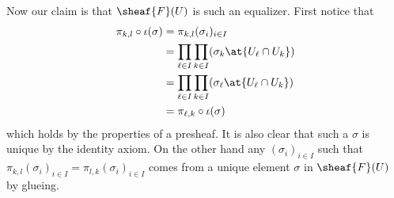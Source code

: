 Now our claim is that $\sheaf{F}(U)$ is such an equalizer. First
notice that
\begin{align*}
  \pi_{k,l}\circ \iota (\sigma) &= \pi_{k,l} (\sigma_i)_{i\in I} \\
                                &=\prod_{\ell \in I} \prod_{k\in
                                  I}(\sigma_k\at{U_\ell\cap U_k}) \\
                                &= \prod_{\ell \in I} \prod_{k\in
                                  I}(\sigma_\ell\at{U_\ell\cap U_k})\\
                                &= \pi_{\ell,k}\circ \iota (\sigma)
\end{align*}
which holds by the properties of a presheaf. It is also clear that
such a $\sigma$ is unique by the identity axiom. On the other hand any
$(\sigma_i)_{i\in I}$ such that $\pi_{k,l} (\sigma_i)_{i\in I} =
\pi_{l,k} (\sigma_i)_{i\in I}$ comes from a unique element $\sigma$ in
$\sheaf{F}(U)$ by glueing.

